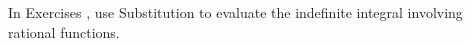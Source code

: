 {\noindent In Exercises}
{, use Substitution to evaluate the indefinite integral involving rational functions.}
